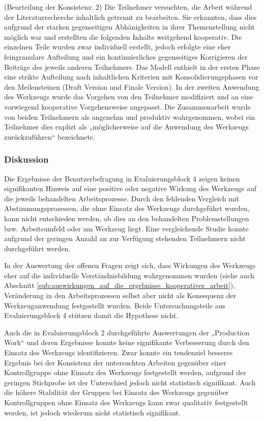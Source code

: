 (Beurteilung der Konsistenz: 2) Die Teilnehmer versuchten, die Arbeit während der Literaturrecherche inhaltlich getrennt zu bearbeiten. Sie erkannten, dass dies aufgrund der starken gegenseitigen Abhänigkeiten in ihrer Themenstellung nicht möglich war und erstellten die folgenden Inhalte weitgehend kooperativ. Die einzelnen Teile wurden zwar individuell erstellt, jedoch erfolgte eine eher feingranulare Aufteilung und ein kontinuierliches gegenseitiges Korrigieren der Beiträge des jeweils anderen Teilnehmers. Das Modell enthielt in der ersten Phase eine strikte Aufteilung nach inhaltlichen Kriterien mit Konsolidierungsphasen vor den Meilensteinen (Draft Version und Finale Version). In der zweiten Anwendung des Werkzeugs wurde das Vorgehen von den Teilnehmer modifiziert und an eine vorwiegend kooperative Vorgehensweise angepasst. Die Zusammenarbeit wurde von beiden Teilnehmern als angenehm und produktiv wahrgenommen, wobei ein Teilnehmer dies explizt als „möglicherweise auf die Anwendung des Werkzeugs zurückzuführen“ bezeichnete.


\subsubsection{Diskussion} 

Die Ergebnisse der Benutzerbefragung in Evaluierungsblock 4 zeigen keinen signifikanten Hinweis auf eine positive oder negative Wirkung des Werkzeugs auf die jeweils behandelten Arbeitsprozesse. Durch den fehlenden Vergleich mit Abstimmungsprozessen, die ohne Einsatz des Werkzeugs durchgeführt wurden, kann nicht entschieden werden, ob dies an den behandelten Problemstellungen bzw. Arbeitsumfeld oder am Werkzeug liegt. Eine vergleichende Studie konnte aufgrund der geringen Anzahl an zur Verfügung stehenden Teilnehmern nicht durchgeführt werden.

In der Auswertung der offenen Fragen zeigt sich, dass Wirkungen des Werkzeugs eher auf die individuelle Verständnisbildung wahrgenommen wurden (siehe auch Abschnitt \ref{sub:auswirkungen_auf_die_ergebnisse_kooperativer_arbeit}), Veränderung in den Arbeitsprozessen selbst aber nicht als Konsequenz der Werkzeuganwendung festgestellt wurden. Beide Untersuchungsteile aus Evaluierungsblock 4 stützen damit die Hypothese nicht.

Auch die in Evaluierungsblock 2 durchgeführte Auswertungen der „Production Work“ und deren Ergebnisse konnte keine signifikante Verbesserung durch den Einsatz des Werkzeugs identifizieren. Zwar konnte ein tendenziel besseres Ergebnis bei der Konsistenz der untersuchten Arbeiten gegenüber einer Kontrollgruppe ohne Einsatz des Werkzeugs festgestellt werden, aufgrund der geringen Stichprobe ist der Unterschied jedoch nicht statistisch signifikant. Auch die höhere Stabilität der Gruppen bei Einsatz des Werkzeugs gegenüber Kontrollgruppen ohne Einsatz des Werkzeugs kann zwar qualitativ festgestellt werden, ist jedoch wiederum nicht statistisch signifikant. 

